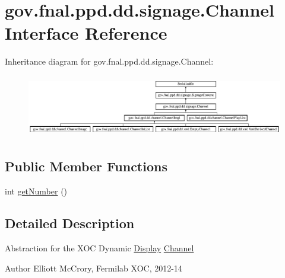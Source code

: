\hypertarget{interfacegov_1_1fnal_1_1ppd_1_1dd_1_1signage_1_1Channel}{\section{gov.\-fnal.\-ppd.\-dd.\-signage.\-Channel Interface Reference}
\label{interfacegov_1_1fnal_1_1ppd_1_1dd_1_1signage_1_1Channel}
}
Inheritance diagram for gov.\-fnal.\-ppd.\-dd.\-signage.\-Channel\-:\begin{figure}[H]
\begin{center}
\leavevmode
\includegraphics[height=2.766798cm]{interfacegov_1_1fnal_1_1ppd_1_1dd_1_1signage_1_1Channel}
\end{center}
\end{figure}
\subsection*{Public Member Functions}
\begin{DoxyCompactItemize}
\item 
int \hyperlink{interfacegov_1_1fnal_1_1ppd_1_1dd_1_1signage_1_1Channel_ad6adca9a7ce66bbc80e2cb611c9c9587}{get\-Number} ()
\end{DoxyCompactItemize}


\subsection{Detailed Description}
Abstraction for the X\-O\-C Dynamic \hyperlink{interfacegov_1_1fnal_1_1ppd_1_1dd_1_1signage_1_1Display}{Display} \hyperlink{interfacegov_1_1fnal_1_1ppd_1_1dd_1_1signage_1_1Channel}{Channel}

\begin{DoxyAuthor}{Author}
Elliott Mc\-Crory, Fermilab X\-O\-C, 2012-\/14 
\end{DoxyAuthor}


